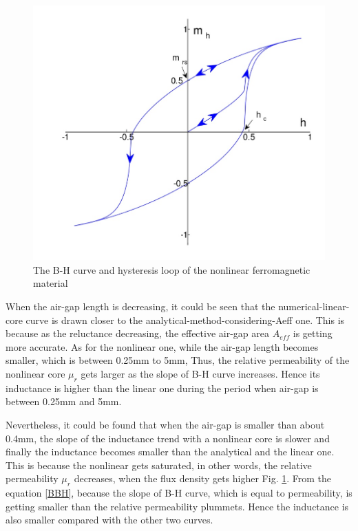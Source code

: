 \documentclass[a4paper]{IEEEtran}
\begin{document}
{\begin{figure}[H]
\includegraphics[scale=0.4]{BH.jpg}
\caption{The B-H curve and hysteresis loop of the nonlinear ferromagnetic material\label{BH}}\par
\end{figure} 
When the air-gap length is decreasing, it could be seen that the numerical-linear-core curve is drawn closer to the analytical-method-considering-Aeff one.
This is because as the reluctance decreasing, 
the effective air-gap area $A_{eff}$ is getting more accurate.
As for the nonlinear one, while the air-gap length becomes smaller, which is between 0.25mm to 5mm,
Thus, the relative permeability of the nonlinear core $\mu_r$ gets larger as the slope of B-H curve increases.
Hence its inductance is higher than the linear one during the period when air-gap is between 0.25mm and 5mm. 

Nevertheless, it could be found that when the air-gap is smaller than about 0.4mm, 
the slope of the inductance trend with a nonlinear core is slower and finally the inductance becomes smaller than the analytical 
and the linear one. This is because the nonlinear gets saturated, in other words, the relative permeability $\mu_r$ decreases, 
when the flux density gets higher Fig. {\ref{BH}}. 
From the equation \eqref{BBH}, because the slope of B-H curve,
which is equal to permeability, is getting smaller than 
the relative permeability plummets. 
Hence the inductance is also smaller compared with the other two curves.\par
 
}
\end{document}
